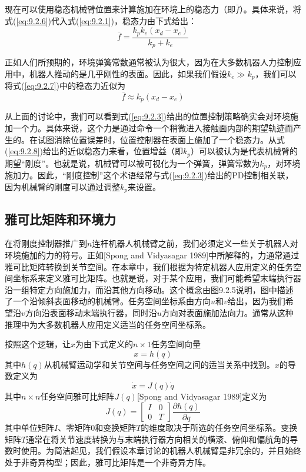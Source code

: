 \documentclass[12pt,a4paper]{ctexart}
\begin{document}
现在可以使用稳态机械臂位置来计算施加在环境上的稳态力（即$\bar{f}$）。具体来说，将式(\ref{eq:9.2.6})代入式(\ref{eq:9.2.1})，稳态力由下式给出：
\begin{equation}\label{eq:9.2.7}
\bar{f} = \frac{k_p k_e(x_d - x_e)}{k_p + k_e}
\end{equation}

正如人们所预期的，环境弹簧常数通常被认为很大，因为在大多数机器人力控制应用中，机器人推动的是几乎刚性的表面。因此，如果我们假设$k_e \gg k_p$，我们可以将式(\ref{eq:9.2.7})中的稳态力近似为
\begin{equation}\label{eq:9.2.8}
\bar{f} \approx k_p(x_d - x_e)
\end{equation}

从上面的讨论中，我们可以看到式(\ref{eq:9.2.3})给出的位置控制策略确实会对环境施加一个力。具体来说，这个力是通过命令一个稍微进入接触面内部的期望轨迹而产生的。在试图消除位置误差时，位置控制器在表面上施加了一个稳态力。从式(\ref{eq:9.2.8})给出的近似稳态力来看，位置增益（即$k_p$）可以被认为是代表机械臂的期望``刚度''。也就是说，机械臂可以被可视化为一个弹簧，弹簧常数为$k_p$，对环境施加力。因此，``刚度控制''这个术语经常与式(\ref{eq:9.2.3})给出的PD控制相关联，因为机械臂的刚度可以通过调整$k_p$来设置。

\subsection{雅可比矩阵和环境力}

在将刚度控制器推广到$n$连杆机器人机械臂之前，我们必须定义一些关于机器人对环境施加的力的符号。正如[Spong and Vidyasagar 1989]中所解释的，力通常通过雅可比矩阵转换到关节空间。在本章中，我们根据为特定机器人应用定义的任务空间坐标系来定义雅可比矩阵。也就是说，对于某个应用，我们可能希望末端执行器沿一组特定方向施加力，而沿其他方向移动。这个概念由图9.2.5说明，图中描述了一个沿倾斜表面移动的机械臂。任务空间坐标系由方向$u$和$v$给出，因为我们希望沿$v$方向沿表面移动末端执行器，同时沿$u$方向对表面施加法向力。通常从这种推理中为大多数机器人应用定义适当的任务空间坐标系。

按照这个逻辑，让$x$为由下式定义的$n \times 1$任务空间向量
\begin{equation}\label{eq:9.2.9}
x = h(q)
\end{equation}
其中$h(q)$从机械臂运动学和关节空间与任务空间之间的适当关系中找到。$x$的导数定义为
\begin{equation}\label{eq:9.2.10}
\dot{x} = J(q)\dot{q}
\end{equation}
其中$n \times n$任务空间雅可比矩阵$J(q)$[Spong and Vidyasagar 1989]定义为
\begin{equation}\label{eq:9.2.11}
J(q) = \begin{bmatrix} I & 0 \\ 0 & T \end{bmatrix} \frac{\partial h(q)}{\partial q}
\end{equation}
其中单位矩阵$I$、零矩阵$0$和变换矩阵$T$的维度取决于所选的任务空间坐标系。变换矩阵$T$通常在将关节速度转换为与末端执行器方向相关的横滚、俯仰和偏航角的导数时使用。为简洁起见，我们假设本章讨论的机器人机械臂是非冗余的，并且始终处于非奇异构型；因此，雅可比矩阵是一个非奇异方阵。
\end{document}
